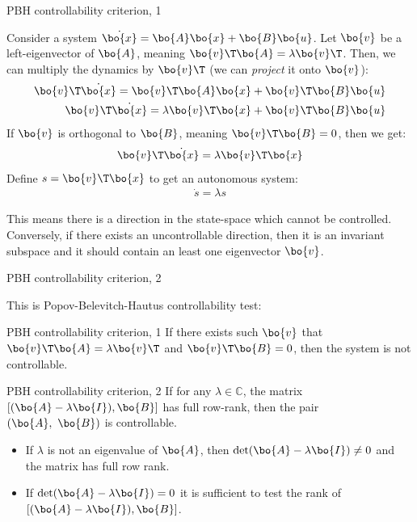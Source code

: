 \documentclass{beamer}
\begin{document}
\begin{frame}{PBH controllability criterion, 1}
	\begin{flushleft}
		
		Consider a system $\dot{\bo{x}}=\bo{A}\bo{x}+\bo{B}\bo{u}$. Let $\bo{v}$ be a left-eigenvector of $\bo{A}$, meaning $\bo{v}\T \bo{A} = \lambda \bo{v}\T$. Then, we can multiply the dynamics by $\bo{v}\T$ (we can \emph{project} it onto $\bo{v}$):
		\begin{align}
			\bo{v}\T \dot{\bo{x}}=\bo{v}\T \bo{A}\bo{x}+\bo{v}\T \bo{B}\bo{u}
			\\
			\bo{v}\T \dot{\bo{x}}=\lambda \bo{v}\T \bo{x}+\bo{v}\T \bo{B}\bo{u}
		\end{align}
		If $\bo{v}$ is orthogonal to $\bo{B}$, meaning $\bo{v}\T\bo{B} = 0$, then we get:
		\begin{align}
			\bo{v}\T \dot{\bo{x}}=\lambda \bo{v}\T \bo{x}
		\end{align}
		Define $s = \bo{v}\T \bo{x}$ to get an autonomous system:
		\begin{align}
			\dot{s}=\lambda s
		\end{align}
		
		This means there is a direction in the state-space which cannot be controlled. Conversely, if there exists an uncontrollable direction, then it is an invariant subspace and it should contain an least one eigenvector $\bo{v}$.
				
	\end{flushleft}
\end{frame}


\begin{frame}{PBH controllability criterion, 2}
	\begin{flushleft}
		
		This is Popov-Belevitch-Hautus controllability test:
		
		\begin{block}{PBH controllability criterion, 1}
			If there exists such $\bo{v}$ that $\bo{v}\T \bo{A} = \lambda \bo{v}\T$ and $\bo{v}\T\bo{B} = 0$, then the system is not controllable.
		\end{block}
		
		\begin{block}{PBH controllability criterion, 2}
			If for any $\lambda \in \mathbb{C}$, the matrix $[ (\bo{A}-\lambda\bo{I}), \bo{B}]$ has full row-rank, then the pair $(\bo{A}, \ \bo{B})$ is controllable.
		\end{block}
		
		\begin{itemize}
			\item If $\lambda$ is not an eigenvalue of $\bo{A}$, then $\text{det}(\bo{A}-\lambda\bo{I}) \neq 0$ and the matrix has full row rank.
			
			\item If $\text{det}(\bo{A}-\lambda\bo{I}) = 0$ it is sufficient to test the rank of $[ (\bo{A}-\lambda\bo{I}), \bo{B}]$.

			
		\end{itemize}
		
	\end{flushleft}
\end{frame}
\end{document}
